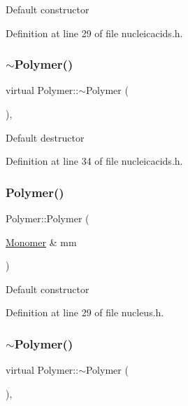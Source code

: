 Default constructor 

Definition at line 29 of file nucleicacids.\+h.

\mbox{\label{class_polymer_aac2b3983f375a5691c7d5ca1a79594d5}} 
\subsubsection{\texorpdfstring{$\sim$\+Polymer()}{~Polymer()}\hspace{0.1cm}{\footnotesize\ttfamily [8/11]}}
{\footnotesize\ttfamily virtual Polymer\+::$\sim$\+Polymer (\begin{DoxyParamCaption}{ }\end{DoxyParamCaption})\hspace{0.3cm}{\ttfamily [inline]}, {\ttfamily [virtual]}}

Default destructor 

Definition at line 34 of file nucleicacids.\+h.

\mbox{\label{class_polymer_ae77454a3908652e4df6a26b9cac509a5}} 
\subsubsection{\texorpdfstring{Polymer()}{Polymer()}\hspace{0.1cm}{\footnotesize\ttfamily [9/14]}}
{\footnotesize\ttfamily Polymer\+::\+Polymer (\begin{DoxyParamCaption}\item[{\hyperlink{class_monomer}{Monomer} \&}]{mm }\end{DoxyParamCaption})\hspace{0.3cm}{\ttfamily [inline]}}

Default constructor 

Definition at line 29 of file nucleus.\+h.

\mbox{\label{class_polymer_aac2b3983f375a5691c7d5ca1a79594d5}} 
\subsubsection{\texorpdfstring{$\sim$\+Polymer()}{~Polymer()}\hspace{0.1cm}{\footnotesize\ttfamily [9/11]}}
{\footnotesize\ttfamily virtual Polymer\+::$\sim$\+Polymer (\begin{DoxyParamCaption}{ }\end{DoxyParamCaption})\hspace{0.3cm}{\ttfamily [inline]}, {\ttfamily [virtual]}}


